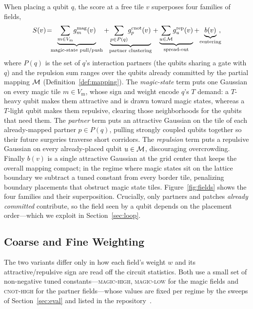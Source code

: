 When placing a qubit $q$, the score at a free tile $v$ superposes four families of
fields,
\begin{equation}
S(v)\!=\!\!\!
   \underbrace{\sum_{m\in V_{\mathrm m}}\! g^{\mathrm{mag}}_m(v)}_{\text{magic-state pull/push}}
 +\!\underbrace{\sum_{p\in P(q)}\! g^{\mathrm{cnot}}_p(v)}_{\text{partner clustering}}
 + \underbrace{\sum_{u\in \M}\! g^{\mathrm{rep}}_u(v)}_{\text{spread-out}}
 +\!\underbrace{b(v)}_{\text{centering}}\!\!,
\label{eq:score}
\end{equation}
where $P(q)$ is the set of $q$'s interaction partners (the qubits sharing a gate
with $q$) and the repulsion sum ranges over the qubits already committed by the
partial mapping $\mathcal{M}$ (Definition~\ref{def:mapping}). The \emph{magic-state}
term puts one Gaussian on every magic tile $m\in V_{\mathrm m}$, whose sign and
weight encode $q$'s $T$ demand: a $T$-heavy qubit makes them attractive and is
drawn toward magic states, whereas a $T$-light qubit makes them repulsive,
clearing those neighborhoods for the qubits that need them. The
\emph{partner} term puts an attractive Gaussian on the tile of each
already-mapped partner $p\in P(q)$, pulling strongly coupled qubits together so
their future surgeries traverse short corridors. The \emph{repulsion} term puts a
repulsive Gaussian on every already-placed qubit $u\in\mathcal{M}$, discouraging
overcrowding. Finally $b(v)$ is a single attractive
Gaussian at the grid center that keeps the overall mapping compact; in the regime
where magic states sit on the lattice boundary we subtract a tuned constant from every border tile, penalizing boundary placements that obstruct magic state tiles.
Figure~\ref{fig:fields} shows the four families and their superposition. Crucially,
only partners and patches \emph{already committed} contribute, so the field seen by a qubit depends on the placement order---which we exploit in
Section~\ref{sec:loop}.



\subsection{Coarse and Fine Weighting}

The two variants differ only in how each field's weight $w$ and its
attractive/repulsive sign are read off the circuit statistics. Both use a small
set of non-negative tuned constants---\textsc{magic-high}, \textsc{magic-low} for
the magic fields and \textsc{cnot-high} for the partner fields---whose values are
fixed per regime by the sweeps of Section~\ref{sec:eval} and listed in the
repository~\cite{ftqc}.

